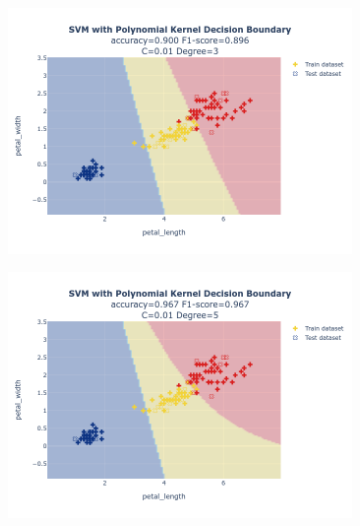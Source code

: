 \documentclass{article}
\begin{document}
\begin{figure}
    \begin{subfigure}{0.3\textwidth}
        \centering
        \includegraphics[scale=.13]{images/implementation/q1/polynomial_kernel/petal_length_petal_width_0.01_3.png}
    \end{subfigure}
    \hfill
    \begin{subfigure}{0.3\textwidth}
        \centering
        \includegraphics[scale=.13]{images/implementation/q1/polynomial_kernel/petal_length_petal_width_0.01_5.png}
    \end{subfigure}
    \hfill
    \begin{subfigure}{0.3\textwidth}
        \centering

\end{subfigure}
\end{figure}
\end{document}
